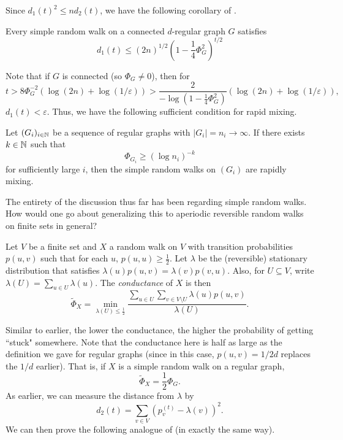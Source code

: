 Since $d_1(t)^2 \leq n d_2(t)$, we have the following corollary of .

\begin{corollary}
Every simple random walk on a connected $d$-regular graph $G$ satisfies
\[ d_1(t) \leq (2n)^{1/2} \left(1-\frac{1}{4}\Phi_G^2\right)^{t/2} \]
\end{corollary}

Note that if $G$ is connected (so $\Phi_G\neq 0$), then for
\begin{equation}
\label{eqn: condition on time in terms of conductance}
t > 8\Phi_G^{-2}\left(\log(2n)+\log(1/\varepsilon)\right) > \frac{2}{-\log\left(1-\frac{1}{4}\Phi_G^2\right)} \left(\log(2n)+\log(1/\varepsilon)\right),
\end{equation}
$d_1(t)<\varepsilon$. Thus, we have the following sufficient condition for rapid mixing.

\begin{lemma}
Let $(G_i)_{i\in\mathbb{N}}$ be a sequence of regular graphs with $|G_i|=n_i\to\infty$. If there exists $k\in\mathbb{N}$ such that
\[ \Phi_{G_i} \geq (\log n_i)^{-k} \]
for sufficiently large $i$, then the simple random walks on $(G_i)$ are rapidly mixing.
\end{lemma}

The entirety of the discussion thus far has been regarding simple random walks. How would one go about generalizing this to aperiodic reversible random walks on finite sets in general?

\begin{fdef}
Let $V$ be a finite set and $X$ a random walk on $V$ with transition probabilities $p(u,v)$ such that for each $u$, $p(u,u)\geq \frac{1}{2}$. Let $\lambda$ be the (reversible) stationary distribution that satisfies $\lambda(u)p(u,v)=\lambda(v)p(v,u)$. Also, for $U\subseteq V$, write $\lambda(U)=\sum_{u\in U}\lambda(u)$. The \textit{conductance} of $X$ is then
\[ \tilde{\Phi}_X = \min_{\lambda(U)\leq\frac{1}{2}} \frac{\sum_{u\in U}\sum_{v\in V\setminus U} \lambda(u)p(u,v)}{\lambda(U)}. \]
\end{fdef}

Similar to earlier, the lower the conductance, the higher the probability of getting ``stuck" somewhere. Note that the conductance here is half as large as the definition we gave for regular graphs (since in this case, $p(u,v)=1/2d$ replaces the $1/d$ earlier). That is, if $X$ is a simple random walk on a regular graph,
\[ \tilde{\Phi}_X = \frac{1}{2}\Phi_G. \]
As earlier, we can measure the distance from $\lambda$ by
\[ d_2(t) = \sum_{v\in V} \left(p_v^{(t)}-\lambda(v)\right)^2. \]
We can then prove the following analogue of  (in exactly the same way).

